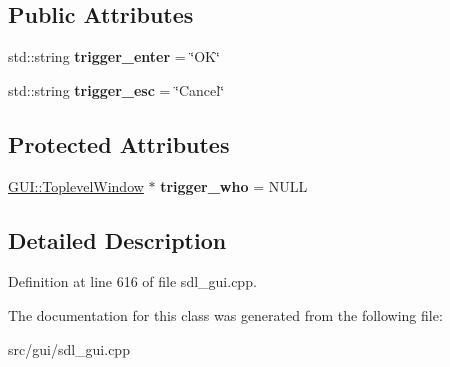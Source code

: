 \subsection*{Public Attributes}
\begin{DoxyCompactItemize}
\item 
\hypertarget{classInputWithEnterKey_ab1f039aa213cc2c6d189a712c456958e}{std\-::string {\bfseries trigger\-\_\-enter} = \char`\"{}O\-K\char`\"{}}\label{classInputWithEnterKey_ab1f039aa213cc2c6d189a712c456958e}

\item 
\hypertarget{classInputWithEnterKey_ad0f1644bc2918baa46e8c63d3193b3fe}{std\-::string {\bfseries trigger\-\_\-esc} = \char`\"{}Cancel\char`\"{}}\label{classInputWithEnterKey_ad0f1644bc2918baa46e8c63d3193b3fe}

\end{DoxyCompactItemize}
\subsection*{Protected Attributes}
\begin{DoxyCompactItemize}
\item 
\hypertarget{classInputWithEnterKey_a28afbaf196623f3534601338135fb6ea}{\hyperlink{classGUI_1_1ToplevelWindow}{G\-U\-I\-::\-Toplevel\-Window} $\ast$ {\bfseries trigger\-\_\-who} = N\-U\-L\-L}\label{classInputWithEnterKey_a28afbaf196623f3534601338135fb6ea}

\end{DoxyCompactItemize}


\subsection{Detailed Description}


Definition at line 616 of file sdl\-\_\-gui.\-cpp.



The documentation for this class was generated from the following file\-:\begin{DoxyCompactItemize}
\item 
src/gui/sdl\-\_\-gui.\-cpp\end{DoxyCompactItemize}
